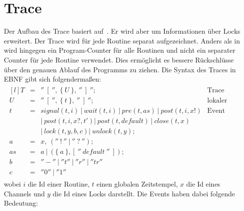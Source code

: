 \section{Trace}\label{Chap:Tracer-Sec:Trace}
Der Aufbau des Trace basiert auf~\cite{PPDP18}. Er wird aber um Informationen 
über Locks erweitert. Der Trace wird für jede Routine
separat aufgezeichnet. Anders als in~\cite{PPDP18} wird hingegen ein 
Program-Counter für alle Routinen und nicht ein separater Counter für jede 
Routine verwendet. Dies ermöglicht es bessere Rückschlüsse über den genauen 
Ablauf des Programms zu ziehen.  
Die Syntax des Traces in EBNF gibt sich 
folgendermaßen:
\begin{align*}
  \begin{matrix*}[l]
    T & = & ''\ [\ '',\ \{\ U\ \},\ ''\ ]\ ''; & \text{Trace}\\
    U & = & ''\ [\ '',\ \{\ t\ \},\ ''\ ]\ ''; & \text{lokaler Trace} \\
    t & = & signal(t, i)\ |\ wait(t, i)\ |\ pre(t, as)\ |\ post(t, i, x!) & \text{Event}\\
      &   & |\ post(t, i, x?, t') |\ post(t, default)\ |\ close(t, x)\  & \\
      &   & |\ lock(t, y, b, c) |\ unlock(t, y); & \\
    a & = & x,\ (''\ !\ ''\ |\ ''\ ?\ ''); & \\
    as & = & a\ |\ (\{\ a\ \}, [\ ''\ default\ ''\ ]); & \\
    b & = & ''-''\ |\ ''t''\ |\ ''r''\ |\ ''tr'' & \\
    c & = & ''0''\ |\ ''1''
  \end{matrix*}
\end{align*}
wobei $i$ die Id einer Routine, $t$ einen globalen Zeitstempel, $x$ die Id eines 
Channels und $y$ die Id eines Locks darstellt. Die Events haben dabei folgende Bedeutung:
